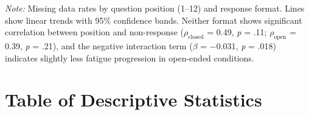 \noindent\textit{Note:} Missing data rates by question position (1--12) and response format. Lines show linear trends with 95\% confidence bands. Neither format shows significant correlation between position and non-response ($\rho_{\text{closed}}$ = 0.49, \textit{p} = .11; $\rho_{\text{open}}$ = 0.39, \textit{p} = .21), and the negative interaction term ($\beta$ = $-$0.031, \textit{p} = .018) indicates slightly less fatigue progression in open-ended conditions.

\clearpage

\section{Table of Descriptive Statistics}
\label{appendix-descriptive-table}


